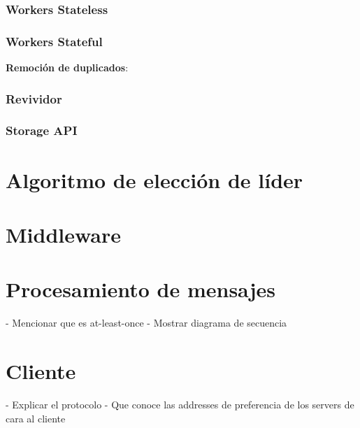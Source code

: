 \documentclass[titlepage,a4paper,oneside]{article}
\begin{document}
\subsubsection{Workers Stateless}

\subsubsection{Workers Stateful}
\textbf{Remoción de duplicados}:


\subsubsection{Revividor}

\subsubsection{Storage API}

\section{Algoritmo de elección de líder}

\section{Middleware}

\section{Procesamiento de mensajes}
- Mencionar que es at-least-once
- Mostrar diagrama de secuencia

\section{Cliente}
- Explicar el protocolo
- Que conoce las addresses de preferencia de los servers de cara al cliente

\printbibliography
\end{document}
